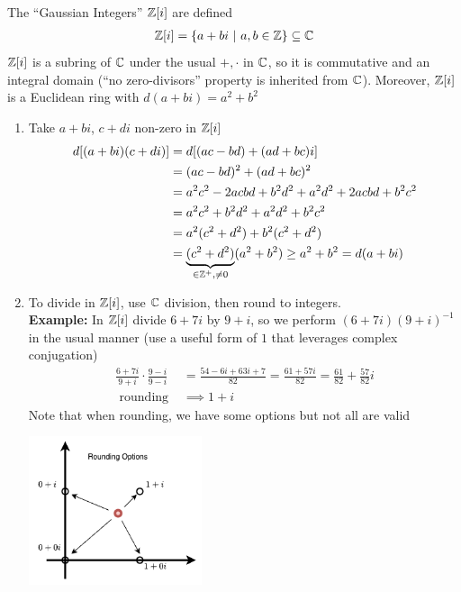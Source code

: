 \begin{example}
    The ``Gaussian Integers'' ${\mathbb{ Z}}[i]$ are defined
    \begin{align}
        {\mathbb{ Z}}[i] = \{a+bi \ | \ a,b \in {\mathbb{ Z}} \} \subseteq {\mathbb{ C}} \nonumber
    \end{align}
    ${\mathbb{ Z}}[i]$ is a subring of ${\mathbb{ C}}$ under the usual $+, \cdot$ in ${\mathbb{ C}}$, so it is commutative and an integral domain (``no zero-divisors'' property is inherited from ${\mathbb{ C}}$). 
    Moreover, ${\mathbb{ Z}}[i]$ is a Euclidean ring with $d(a+bi)=a^2+b^2$
    \begin{enumerate}
        \item Take $a+bi$, $c+di$ non-zero in ${\mathbb{ Z}}[i]$
        \begin{align}
            d[(a+bi)(c+di)] &= d[(ac-bd)+(ad+bc)i] \nonumber \\
            &= (ac-bd)^2 + (ad+bc)^2 \nonumber \\
            &= a^2c^2 -2acbd +b^2d^2 +a^2d^2 +2acbd +b^2c^2 \nonumber \\
            &= a^2c^2 +b^2d^2 +a^2d^2 +b^2c^2 \nonumber \\
            &= a^2(c^2+d^2) +b^2(c^2+d^2) \nonumber \\
            &= \underbrace{(c^2+d^2)}_{\in {\mathbb{ Z}}^+,  \neq 0}(a^2+b^2) \geq a^2+b^2 = d(a+bi) \nonumber
        \end{align}
        \item To divide in ${\mathbb{ Z}}[i]$, use ${\mathbb{ C}}$ division, then round to integers. \\ \steezybreak
        \textbf{Example:} In ${\mathbb{ Z}}[i]$ divide $6+7i$ by $9+i$, so we perform $(6+7i)(9+i)^{-1}$ in the usual manner (use a useful form of $1$ that leverages complex conjugation)
        \begin{align}
            \frac{6+7i}{9+i} \cdot \frac{9-i}{9-i} &= \frac{54-6i+63i+7}{82} = \frac{61+57i}{82}= \frac{61}{82}+\frac{57}{82}i \nonumber \\
            \text{ rounding }&\implies \boxed{1+i} \nonumber
        \end{align}
        Note that when rounding, we have some options but not all are valid
        \begin{center}
            \includegraphics[width=0.4\textwidth]{Figures/RoundingOptions.png}

\end{center}
\end{enumerate}
\end{example}
